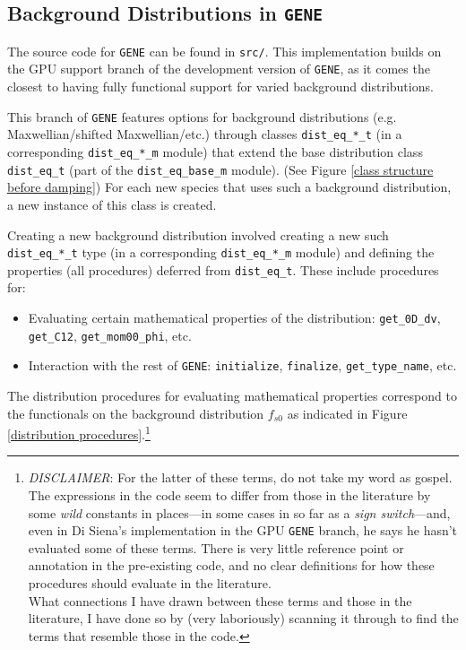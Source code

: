 \subsection{Background Distributions in {\tt GENE}}
    The source code for {\tt GENE} can be found in {\tt src/}. This implementation builds on the GPU support branch of the development version of {\tt GENE}, as it comes the closest to having fully functional support for varied background distributions.
    
    This branch of {\tt GENE} features options for background distributions (e.g. Maxwellian/shifted Maxwellian/etc.) through classes {\tt dist\_eq\_*\_t} (in a corresponding {\tt dist\_eq\_*\_m} module) that extend the base distribution class {\tt dist\_eq\_t} (part of the {\tt dist\_eq\_base\_m} module). (See Figure \ref{class structure before damping}) For each new species that uses such a background distribution, a new instance of this class is created.

    

    Creating a new background distribution involved creating a new such {\tt dist\_eq\_*\_t} type (in a corresponding {\tt dist\_eq\_*\_m} module) and defining the properties (all procedures) deferred from {\tt dist\_eq\_t}. These include procedures for:
    \begin{itemize}
        \item  Evaluating certain mathematical properties of the distribution: {\tt get\_0D\_dv}, {\tt get\_C12}, {\tt get\_mom00\_phi}, etc.
        \item  Interaction with the rest of {\tt GENE}: {\tt initialize}, {\tt finalize}, {\tt get\_type\_name}, etc.
    \end{itemize}
    The distribution procedures for evaluating mathematical properties correspond to the functionals on the background distribution $f_{s0}$ as indicated in Figure \ref{distribution procedures}.\footnote{\emph{DISCLAIMER}: For the latter of these terms, do not take my word as gospel. The expressions in the code seem to differ from those in the literature by some \emph{wild} constants in places—in some cases in so far as a \emph{sign switch}—and, even in Di Siena's implementation in the GPU {\tt GENE} branch, he says he hasn't evaluated some of these terms. There is very little reference point or annotation in the pre-existing code, and no clear definitions for how these procedures should evaluate in the literature. \\ What connections I have drawn between these terms and those in the literature, I have done so by (very laboriously) scanning it through to find the terms that resemble those in the code.}
    
